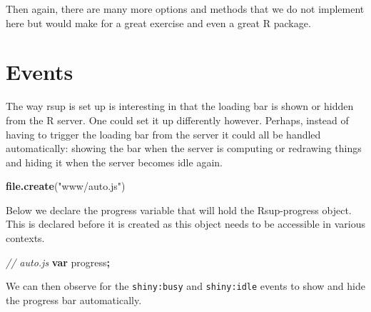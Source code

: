 \documentclass[
]{krantz}
\makeatletter
\newenvironment{Shaded}{\begin{snugshade}}{\end{snugshade}}
\newcommand{\AttributeTok}[1]{\textcolor[rgb]{0.61,0.61,0.61}{#1}}
\newcommand{\CommentTok}[1]{\textcolor[rgb]{0.37,0.37,0.37}{\textit{#1}}}
\newcommand{\KeywordTok}[1]{\textcolor[rgb]{0.27,0.27,0.27}{\textbf{#1}}}
\newcommand{\NormalTok}[1]{#1}
\newcommand{\OperatorTok}[1]{\textcolor[rgb]{0.43,0.43,0.43}{\textbf{#1}}}
\newcommand{\StringTok}[1]{\textcolor[rgb]{0.5,0.5,0.5}{#1}}
\newcommand{\VariableTok}[1]{\textcolor[rgb]{0,0,0}{#1}}
\newenvironment{kframe}{%
\medskip{}
\setlength{\fboxsep}{.8em}
 \def\at@end@of@kframe{}%
 \ifinner\ifhmode%
  \def\at@end@of@kframe{\end{minipage}}%
  \begin{minipage}{\columnwidth}%
 \fi\fi%
 \def\FrameCommand##1{\hskip\@totalleftmargin \hskip-\fboxsep
 \colorbox{shadecolor}{##1}\hskip-\fboxsep
     \hskip-\linewidth \hskip-\@totalleftmargin \hskip\columnwidth}%
 \MakeFramed {\advance\hsize-\width
   \@totalleftmargin\z@ \linewidth\hsize
   \@setminipage}}%
 {\par\unskip\endMakeFramed%
 \at@end@of@kframe}
\renewenvironment{Shaded}{\begin{kframe}}{\end{kframe}}
\makeatother
\begin{document}
Then again, there are many more options and methods that we do not implement here but would make for a great exercise and even a great R package.

\hypertarget{progress-events}{%
\section{Events}\label{progress-events}}

The way rsup is set up is interesting in that the loading bar is shown or hidden from the R server. One could set it up differently however. Perhaps, instead of having to trigger the loading bar from the server it could all be handled automatically: showing the bar when the server is computing or redrawing things and hiding it when the server becomes idle again.

\begin{Shaded}
\begin{Highlighting}[]
\KeywordTok{file.create}\NormalTok{(}\StringTok{"www/auto.js"}\NormalTok{)}
\end{Highlighting}
\end{Shaded}

Below we declare the progress variable that will hold the Rsup-progress object. This is declared before it is created as this object needs to be accessible in various contexts.

\begin{Shaded}
\begin{Highlighting}[]
\CommentTok{// auto.js}
\KeywordTok{var}\NormalTok{ progress}\OperatorTok{;}
\end{Highlighting}
\end{Shaded}

We can then observe for the \texttt{shiny:busy} and \texttt{shiny:idle} events to show and hide the progress bar automatically.

\begin{Shaded}
\end{Shaded}
\end{document}
